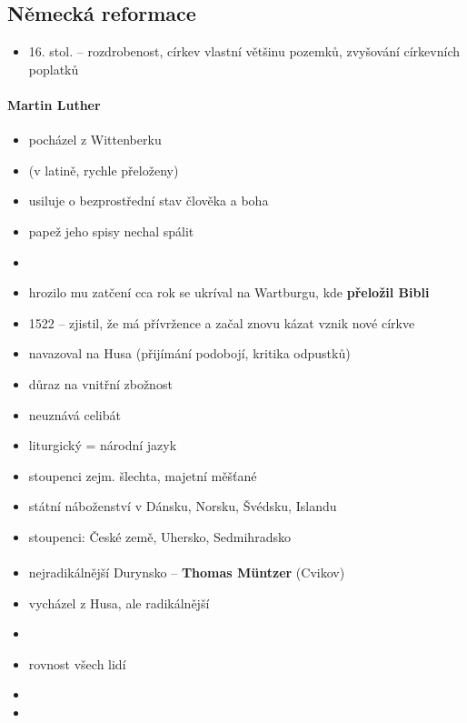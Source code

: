 \subsection{Německá reformace}
\begin{itemize}
\item 16. stol. -- rozdrobenost, církev vlastní většinu pozemků, zvyšování církevních poplatků
\end{itemize}

\paragraph{Martin Luther}
\begin{itemize}
\item pocházel z Wittenberku
\item {} (v latině, rychle přeloženy)
\item usiluje o bezprostřední stav člověka a boha
\item papež jeho spisy nechal spálit
\item {}
\item hrozilo mu zatčení \ra cca rok se ukríval na Wartburgu, kde \textbf{přeložil Bibli}
\item 1522 -- zjistil, že má přívržence a začal znovu kázat \ra vznik nové církve
\item navazoval na Husa (přijímání podobojí, kritika odpustků)
\item důraz na vnitřní zbožnost
\item neuznává celibát
\item liturgický = národní jazyk
\item stoupenci zejm. šlechta, majetní měšťané
\item státní náboženství v Dánsku, Norsku, Švédsku, Islandu
\item stoupenci: České země, Uhersko, Sedmihradsko
\end{itemize}

\paragraph{}
\begin{itemize}
\item nejradikálnější Durynsko -- \textbf{Thomas Müntzer} (Cvikov)
\item vycházel z Husa, ale radikálnější
\item {}
\item rovnost všech lidí
\item {}
\item {}
\end{itemize}

